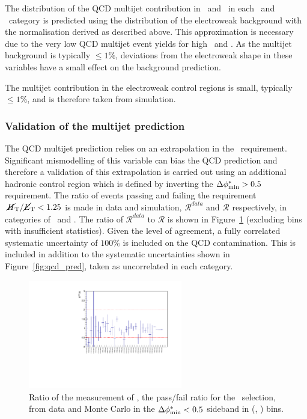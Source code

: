 The distribution of the QCD multijet contribution in \nb ~and \mht~in each \scalht~and \njet~category
is predicted using the distribution of the electroweak background with the normalisation
derived as described above. This approximation is necessary due to the very low QCD multijet
event yields for high \nb ~and \mht. As the multijet background is typically $\le 1\%$, 
deviations from the electroweak shape in these variables have a small effect on the background prediction.

The multijet contribution in the electroweak control regions is small, typically $\le 1\%$, and is 
therefore taken from simulation.

\subsubsection{Validation of the multijet prediction}

The QCD multijet prediction relies on an extrapolation in the \mhtmet~requirement.
Significant mismodelling of this variable can bias the QCD prediction and therefore a validation
of this extrapolation is carried out using an additional hadronic control 
region which is defined by inverting the $\mbox{$\Delta\phi^{*}_{\rm min}$} > 0.5$ requirement. The ratio of events passing and failing 
the requirement $\mbox{$\mbox{$\,\cancel{H}_{\rm T}$} / \mbox{$\cancel{E}_\text{T}$}$} < 1.25$ is made in data and simulation, $\mathcal{R}^{data}$ and $\mathcal{R}$ respectively,
in categories of \njet~and \scalht. The ratio of $\mathcal{R}^{data}$ to $\mathcal{R}$ is shown in
Figure~\ref{fig:RR_qcd} (excluding bins with insufficient statistics). 
Given the level of agreement, a fully correlated systematic uncertainty of $100\%$ is included on
the QCD contamination. This is included in addition to the systematic uncertainties shown in 
Figure~\ref{fig:qcd_pred}, taken as uncorrelated in each category.

\begin{figure}[h!]
  \begin{center}        
    \includegraphics[width=0.6\textwidth]{figures/qcd/plots/doubleQcdSbSrRatio1D}
    \caption{ Ratio of the measurement of \rmhtmet, the pass/fail ratio for the \mhtmet~selection, from data and Monte Carlo in the $\mbox{$\Delta\phi^{*}_{\rm min}$} < 0.5$ sideband in (\scalht, \njet) bins.  
    }
    \label{fig:RR_qcd}
  \end{center} 
\end{figure}


